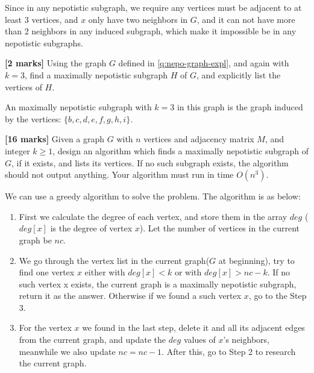 \documentclass{article}
\begin{document}
\begin{Question}
\begin{Subquestion}
\begin{answer}
Since in any nepotistic subgraph, we require any vertices must be adjacent to at least 3 vertices, and $x$ only have two neighbors in $G$, and it can not have more than 2 neighbors in any induced subgraph, which make it impossible be in any nepotistic subgraphs.
\end{answer}

\end{Subquestion}

\begin{Subquestion} \textbf{[2 marks]}
Using the graph \(G\) defined in \ref{q:nepo-graph-expl}, and again with \(k = 3\), find a maximally nepotistic subgraph \(H\) of \(G\), and explicitly list the vertices of \(H\).

\begin{answer}
An maximally nepotistic subgraph with $k=3$ in this graph is the graph induced by the vertices: $\{b, c, d, e, f, g, h, i\}$.
\end{answer}

\end{Subquestion}

\begin{Subquestion} \textbf{[16 marks]}
Given a graph \(G\) with \(n\) vertices and adjacency matrix \(M\), and integer \(k \geq 1\), design an algorithm which finds a maximally nepotistic subgraph of \(G\), if it exists, and lists its vertices. If no such subgraph exists, the algorithm should not output anything. Your algorithm must run in time \(O(n^3)\).

\begin{answer}
We can use a greedy algorithm to solve the problem. The algorithm is as below:

\begin{enumerate}[1]
    \item {
        First we calculate the degree of each vertex, and store them in the 
        array $deg$ ($deg[x]$ is the degree of vertex $x$). Let the number of vertices
        in the current graph be $nc$.
    }
    \item {
        We go through the vertex list in the current graph($G$ at beginning), try to find one vertex
        $x$ either with $deg[x] < k$ or with $deg[x] > nc - k$. If no such vertex 
        x exists, the current graph is a maximally nepotistic subgraph, return it as 
        the answer. Otherwise if we found a such vertex $x$, go to the Step 3. 
    }
    \item {
        For the vertex $x$ we found in the last step, delete it and all its 
        adjacent edges from the current graph, and update the $deg$ values of
        $x$'s neighbors, meanwhile we also update $nc = nc - 1$. After this,
        go to Step 2 to research the current graph.
    }
\end{enumerate}


\end{answer}
\end{Subquestion}
\end{Question}
\end{document}
